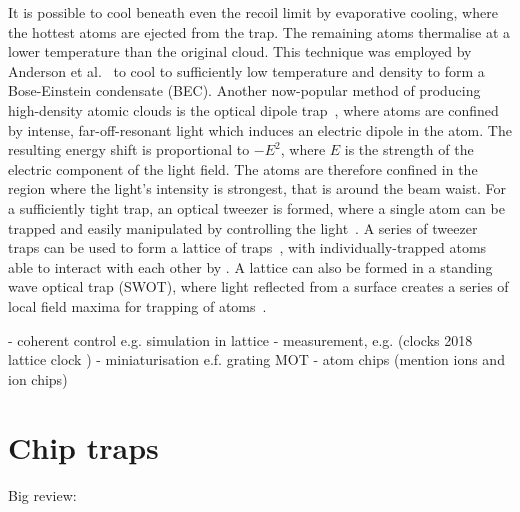 It is possible to cool beneath even the recoil limit by evaporative cooling,
where the hottest atoms are ejected from the trap. The remaining atoms
thermalise at a lower temperature than the original cloud. This technique was
employed by Anderson et al.~\cite{Anderson198} to cool \esRb{} to sufficiently
low temperature and density to form a Bose-Einstein condensate (BEC). Another
now-popular method of producing high-density atomic clouds is the optical
dipole trap~\cite{Chu1986}, where atoms are confined by intense,
far-off-resonant light which induces an electric dipole in the atom. The
resulting energy shift is proportional to $-E^2$, where $E$ is the strength of
the electric component of the light field. The atoms are therefore confined in
the region where the light's intensity is strongest, that is around the beam
waist. For a sufficiently tight trap, an optical tweezer is formed, where a
single atom can be trapped and easily manipulated by controlling the
light~\cite{Schlosser2001}.  A series of tweezer traps can be used to form a
lattice of traps~\cite{Schlosser2001}, with individually-trapped atoms able to
interact with each other by . A lattice can also be formed
in a standing wave optical trap (SWOT), where light reflected from a surface
creates a series of local field maxima for trapping of atoms~\cite{Wu2017}.


- coherent control e.g. simulation in lattice \cite{Schäfer2020}
- measurement, e.g. (clocks 2018 lattice clock \cite{PhysRevX.8.021036})
- miniaturisation e.f. grating MOT \cite{Nshii2013}
- atom chips (mention ions and ion chips)

\section{Chip traps}

Big review: \cite{2011Ac}

